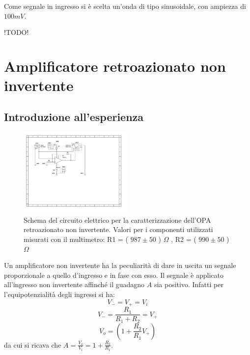 \documentclass[journal]{IEEEtran}
\begin{document}
Come segnale in ingresso si è scelta un'onda di tipo sinusoidale, con ampiezza di $100 mV$.

!TODO!

\section{\textbf{Amplificatore retroazionato non invertente}} %
\subsection{\textbf{Introduzione all'esperienza}}
\begin{figure}[H]%
\begin {center}
\includegraphics[width=0.50\textwidth]{sch-simulations/output/OPA-closed-loop-non-inverting.pdf}
\caption{Schema del circuito elettrico per la caratterizzazione dell'OPA retroazionato non invertente. Valori per i componenti utilizzati misurati con il multimetro: R1 = ( $987 \pm 50$ ) $\Omega$ , R2 = ( $990 \pm 50$ ) $\Omega$}
\label{fig:loop-non-inv}
\end {center}
\end{figure}
Un amplificatore non invertente ha la peculiarità di dare in uscita un segnale proporzionale a quello d'ingresso e in fase con esso. Il segnale è applicato all'ingresso non invertente affinché il guadagno $A$ sia positivo. Infatti per l'equipotenzialità degli ingressi si ha: \[V_{-} = V_{+} = V_{i}\] \[V_{-} = \frac{R_1}{R_1+R_2}=V_{+}\] \[V_{o}=(1+\frac{R_2}{R_1}V_{+})\]
da cui si ricava che $A=\frac{V_{o}}{V_i}=1+\frac{R_2}{R_1}$.
\end{document}

